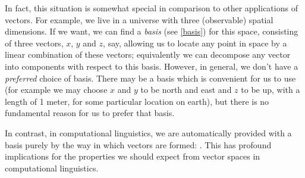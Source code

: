 \documentclass[11pt]{report}
\begin{document}
In fact, this situation is somewhat special in comparison to other applications of vectors. For example, we live in a universe with three (observable) spatial dimensions. If we want, we can find a \emph{basis} (see \ref{basis}) for this space, consisting of three vectors, $x$, $y$ and $z$, say, allowing us to locate any point in space by a linear combination of these vectors; equivalently we can decompose any vector into components with respect to this basis. However, in general, we don't have a \emph{preferred} choice of basis. There may be a basis which is convenient for us to use (for example we may choose $x$ and $y$ to be north and east and $z$ to be up, with a length of 1 meter, for some particular location on earth), but there is no fundamental reason for us to prefer that basis.

In contrast, in computational linguistics, we are automatically provided with a basis purely by the way in which vectors are formed: . This has profound implications for the properties we should expect from vector spaces in computational linguistics.



\end{document}
